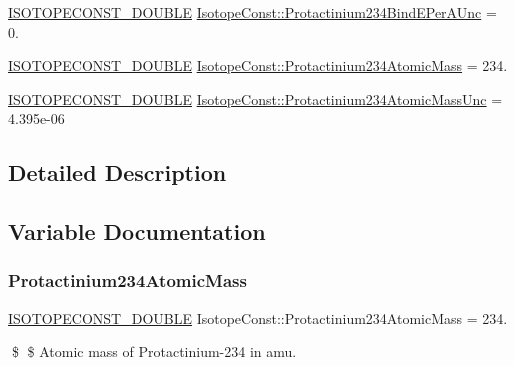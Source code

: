\begin{DoxyCompactItemize}
\item 
\mbox{\hyperlink{group___isotope_const-_macros_ga8f45a7272ce02c0b4c65c44636ed719a}{I\+S\+O\+T\+O\+P\+E\+C\+O\+N\+S\+T\+\_\+\+D\+O\+U\+B\+LE}} \mbox{\hyperlink{group___isotope_const-_protactinium-_pa234_gac875ca673f7cb2ae1248c53bb59ce707}{Isotope\+Const\+::\+Protactinium234\+Bind\+E\+Per\+A\+Unc}} = 0.
\item 
\mbox{\hyperlink{group___isotope_const-_macros_ga8f45a7272ce02c0b4c65c44636ed719a}{I\+S\+O\+T\+O\+P\+E\+C\+O\+N\+S\+T\+\_\+\+D\+O\+U\+B\+LE}} \mbox{\hyperlink{group___isotope_const-_protactinium-_pa234_ga5a611c58912acf1fafd619d5e79e5b71}{Isotope\+Const\+::\+Protactinium234\+Atomic\+Mass}} = 234.
\item 
\mbox{\hyperlink{group___isotope_const-_macros_ga8f45a7272ce02c0b4c65c44636ed719a}{I\+S\+O\+T\+O\+P\+E\+C\+O\+N\+S\+T\+\_\+\+D\+O\+U\+B\+LE}} \mbox{\hyperlink{group___isotope_const-_protactinium-_pa234_ga54f5424ed4646d9ba994e43233df3cb4}{Isotope\+Const\+::\+Protactinium234\+Atomic\+Mass\+Unc}} = 4.\+395e-\/06
\end{DoxyCompactItemize}


\subsection{Detailed Description}


\subsection{Variable Documentation}
\mbox{\label{group___isotope_const-_protactinium-_pa234_ga5a611c58912acf1fafd619d5e79e5b71}} 
\subsubsection{\texorpdfstring{Protactinium234\+Atomic\+Mass}{Protactinium234AtomicMass}}
{\footnotesize\ttfamily \mbox{\hyperlink{group___isotope_const-_macros_ga8f45a7272ce02c0b4c65c44636ed719a}{I\+S\+O\+T\+O\+P\+E\+C\+O\+N\+S\+T\+\_\+\+D\+O\+U\+B\+LE}} Isotope\+Const\+::\+Protactinium234\+Atomic\+Mass = 234.}

\$ \$ Atomic mass of Protactinium-\/234 in amu. \mbox{\label{group___isotope_const-_protactinium-_pa234_ga54f5424ed4646d9ba994e43233df3cb4}} 
